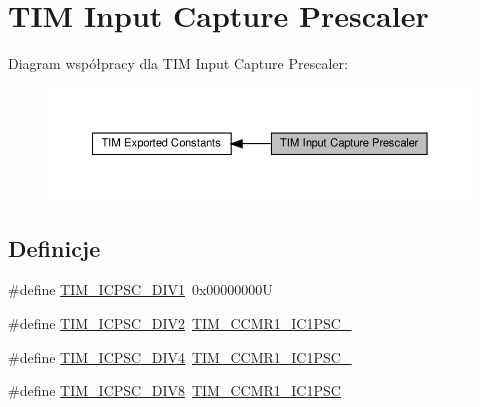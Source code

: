 \hypertarget{group___t_i_m___input___capture___prescaler}{}\section{T\+IM Input Capture Prescaler}
\label{group___t_i_m___input___capture___prescaler}
Diagram współpracy dla T\+IM Input Capture Prescaler\+:\nopagebreak
\begin{figure}[H]
\begin{center}
\leavevmode
\includegraphics[width=350pt]{group___t_i_m___input___capture___prescaler}
\end{center}
\end{figure}
\subsection*{Definicje}
\begin{DoxyCompactItemize}
\item 
\#define \hyperlink{group___t_i_m___input___capture___prescaler_ga8acb44abe3147d883685c1f9f1ce410e}{T\+I\+M\+\_\+\+I\+C\+P\+S\+C\+\_\+\+D\+I\+V1}~0x00000000U
\item 
\#define \hyperlink{group___t_i_m___input___capture___prescaler_ga1d8a7b66add914e2ddd910d2d700978f}{T\+I\+M\+\_\+\+I\+C\+P\+S\+C\+\_\+\+D\+I\+V2}~\hyperlink{group___peripheral___registers___bits___definition_ga05673358a44aeaa56daefca67341b29d}{T\+I\+M\+\_\+\+C\+C\+M\+R1\+\_\+\+I\+C1\+P\+S\+C\+\_}
\item 
\#define \hyperlink{group___t_i_m___input___capture___prescaler_gaf5a675046430fa0f0c95b0dac612828f}{T\+I\+M\+\_\+\+I\+C\+P\+S\+C\+\_\+\+D\+I\+V4}~\hyperlink{group___peripheral___registers___bits___definition_gaf42b75da9b2f127dca98b6ca616f7add}{T\+I\+M\+\_\+\+C\+C\+M\+R1\+\_\+\+I\+C1\+P\+S\+C\+\_}
\item 
\#define \hyperlink{group___t_i_m___input___capture___prescaler_ga5086cb03c89a5c67b199d20b605f00cb}{T\+I\+M\+\_\+\+I\+C\+P\+S\+C\+\_\+\+D\+I\+V8}~\hyperlink{group___peripheral___registers___bits___definition_gab46b7186665f5308cd2ca52acfb63e72}{T\+I\+M\+\_\+\+C\+C\+M\+R1\+\_\+\+I\+C1\+P\+SC}
\end{DoxyCompactItemize}


